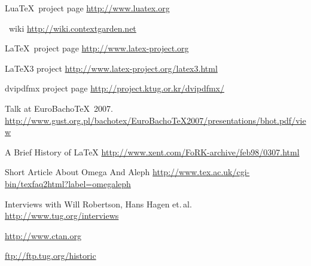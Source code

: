\documentclass{scrartcl}
\begin{document}
\begin{thebibliography}{10}
	{Lua\TeX\ project page}
	\newblock \url{http://www.luatex.org}
	
	\vspace{2ex}
	\vspace{1ex}
	\ConTeXt\ wiki
	\newblock \url{http://wiki.contextgarden.net}
	
	{\LaTeX\ project page}
	\newblock \url{http://www.latex-project.org}
	
	{\LaTeX3 project}
	\newblock \url{http://www.latex-project.org/latex3.html}
	
	\vspace{2ex}
	\vspace{1ex}
	{dvipdfmx project page}
	\newblock \url{http://project.ktug.or.kr/dvipdfmx/}
	
	\vspace{2ex}
	\vspace{1ex}
	\newblock Talk at EuroBacho\TeX\ 2007.\\
	\newblock \url{http://www.gust.org.pl/bachotex/EuroBachoTeX2007/presentations/bhot.pdf/view}
	
	{A Brief History of \LaTeX}
	\newblock \url{http://www.xent.com/FoRK-archive/feb98/0307.html}
	
	{Short Article About Omega And Aleph}
	\newblock \url{http://www.tex.ac.uk/cgi-bin/texfaq2html?label=omegaleph}
	
	{Interviews with Will Robertson, Hans Hagen et.\,al.}
	\newblock \url{http://www.tug.org/interviews}
	
	\vspace{2ex}
	\vspace{1ex}
	
	\newblock \url{http://www.ctan.org}
	
	\newblock \url{ftp://ftp.tug.org/historic}
\end{thebibliography}

\label{sec:text}
\end{document}
